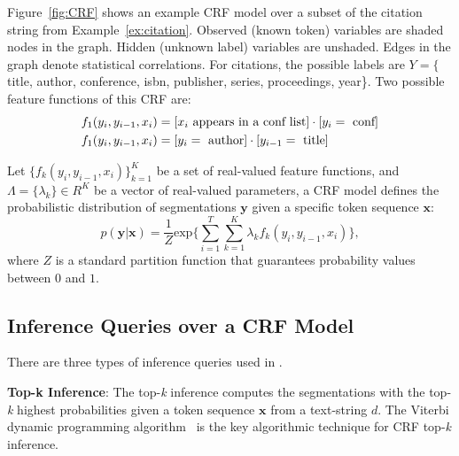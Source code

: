 \begin{example}
Figure~\ref{fig:CRF} shows an example CRF model over a subset of the citation string from Example~\ref{ex:citation}.  Observed (known token) variables are shaded nodes in the graph.  Hidden (unknown label) variables are unshaded.  Edges in the graph denote statistical correlations.  For citations, the possible labels are $Y = \{$title, author, conference, isbn, publisher, series, proceedings, year\}.  Two possible feature functions of this CRF are:
\begin{align*}
    \centering
    f_{1}(y_{i}, y_{i-1}, x_{i}) &= [x_{i} \text{ appears in a conf list}] \cdot [y_{i} = \text{ conf}]\\
    f_{1}(y_{i}, y_{i-1}, x_{i}) &= [y_{i} = \text{ author}] \cdot [y_{i-1} = \text{ title}]
\end{align*}
\end{example}
Let $\{f_{k}(y_{i},y_{i-1},x_{i})\}^{K}_{k=1}$ be a set of real-valued feature functions, and $\Lambda = \{\lambda_{k}\} \in R^{K}$ be a vector of real-valued parameters, a CRF model defines the probabilistic distribution of segmentations $\mathbf{y}$ given a specific token sequence $\mathbf{x}$:
\begin{equation}
\label{eq:CRFmodel}
p(\mathbf{y} | \mathbf{x}) = \frac{1}{Z}\text{exp}\{\sum_{i=1}^{T}\sum_{k=1}^{K}\lambda_{k}f_{k}(y_{i},y_{i-1},x_{i})\},
\end{equation}
where $Z$ is a standard partition function that guarantees probability values between $0$ and $1$.

\subsection{Inference Queries over a CRF Model}
\newcommand{\topk}{top-\textit{k}\xspace}
There are three types of inference queries used in \sysName .

\textbf{Top-k Inference}: The \topk inference computes the segmentations with the \topk highest probabilities given a token sequence $\mathbf{x}$ from a text-string $d$.  The Viterbi dynamic programming algorithm~\cite{Viterbi1973} is the key algorithmic technique for CRF \topk inference.

